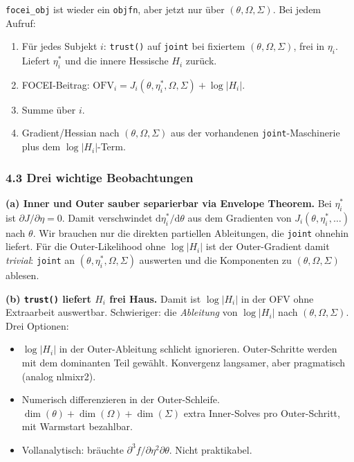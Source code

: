 \documentclass[
]{article}
\providecommand{\tightlist}{%
  \setlength{\itemsep}{0pt}\setlength{\parskip}{0pt}}
\begin{document}
\texttt{focei\_obj} ist wieder ein \texttt{objfn}, aber jetzt nur über
\((\theta, \Omega, \Sigma)\). Bei jedem Aufruf:

\begin{enumerate}
\def\labelenumi{\arabic{enumi}.}
\tightlist
\item
  Für jedes Subjekt \(i\): \texttt{trust()} auf \texttt{joint} bei
  fixiertem \((\theta, \Omega, \Sigma)\), frei in \(\eta_i\). Liefert
  \(\eta_i^*\) und die innere Hessische \(H_i\) zurück.
\item
  FOCEI-Beitrag:
  \(\mathrm{OFV}_i = J_i(\theta, \eta_i^*, \Omega, \Sigma) + \log|H_i|\).
\item
  Summe über \(i\).
\item
  Gradient/Hessian nach \((\theta, \Omega, \Sigma)\) aus der vorhandenen
  \texttt{joint}-Maschinerie plus dem \(\log|H_i|\)-Term.
\end{enumerate}

\subsubsection{4.3 Drei wichtige
Beobachtungen}\label{drei-wichtige-beobachtungen}

\textbf{(a) Inner und Outer sauber separierbar via Envelope Theorem.}
Bei \(\eta_i^*\) ist \(\partial J / \partial \eta = 0\). Damit
verschwindet \(\mathrm{d}\eta_i^*/\mathrm{d}\theta\) aus dem Gradienten
von \(J_i(\theta, \eta_i^*, \dots)\) nach \(\theta\). Wir brauchen nur
die direkten partiellen Ableitungen, die \texttt{joint} ohnehin liefert.
Für die Outer-Likelihood ohne \(\log|H_i|\) ist der Outer-Gradient damit
\emph{trivial}: \texttt{joint} an \((\theta, \eta_i^*, \Omega, \Sigma)\)
auswerten und die Komponenten zu \((\theta, \Omega, \Sigma)\) ablesen.

\textbf{(b) \texttt{trust()} liefert \(H_i\) frei Haus.} Damit ist
\(\log|H_i|\) in der OFV ohne Extraarbeit auswertbar. Schwieriger: die
\emph{Ableitung} von \(\log|H_i|\) nach \((\theta, \Omega, \Sigma)\).
Drei Optionen:

\begin{itemize}
\tightlist
\item
  \(\log|H_i|\) in der Outer-Ableitung schlicht ignorieren.
  Outer-Schritte werden mit dem dominanten Teil gewählt. Konvergenz
  langsamer, aber pragmatisch (analog nlmixr2).
\item
  Numerisch differenzieren in der Outer-Schleife.
  \(\dim(\theta) + \dim(\Omega) + \dim(\Sigma)\) extra Inner-Solves pro
  Outer-Schritt, mit Warmstart bezahlbar.
\item
  Vollanalytisch: bräuchte
  \(\partial^3 f / \partial\eta^2 \partial\theta\). Nicht praktikabel.
\end{itemize}
\end{document}
